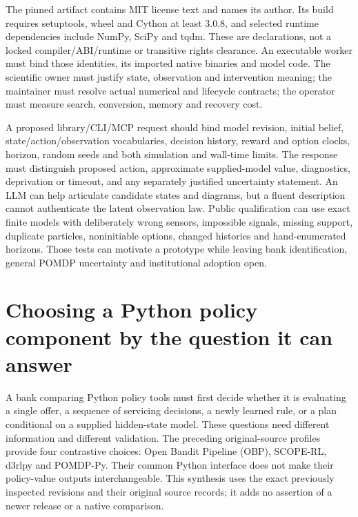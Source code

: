 The pinned artifact contains MIT license text and names its author. Its build
requires setuptools, wheel and Cython at least 3.0.8, and selected runtime
dependencies include NumPy, SciPy and tqdm. These are declarations, not a
locked compiler/ABI/runtime or transitive rights clearance. An executable worker
must bind those identities, its imported native binaries and model code. The
scientific owner must justify state, observation and intervention meaning; the
maintainer must resolve actual numerical and lifecycle contracts; the operator
must measure search, conversion, memory and recovery cost.
\cite{exec23_pomdppy_sources}

A proposed library/CLI/MCP request should bind model revision, initial belief,
state/action/observation vocabularies, decision history, reward and option clocks,
horizon, random seeds and both simulation and wall-time limits. The response
must distinguish proposed action, approximate supplied-model value, diagnostics,
deprivation or timeout, and any separately justified uncertainty statement.
An LLM can help articulate candidate states and diagrams, but a fluent
description cannot authenticate the latent observation law. Public qualification
can use exact finite models with deliberately wrong sensors, impossible signals,
missing support, duplicate particles, noninitiable options, changed histories
and hand-enumerated horizons. Those tests can motivate a prototype while leaving
bank identification, general POMDP uncertainty and institutional adoption open.


\section{Choosing a Python policy component by the question it can answer}
\label{sec:exec24-policies-python}

A bank comparing Python policy tools must first decide whether it is evaluating
a single offer, a sequence of servicing decisions, a newly learned rule, or a
plan conditional on a supplied hidden-state model. These questions need different
information and different validation. The preceding original-source profiles
provide four contrastive choices: Open Bandit Pipeline (OBP), SCOPE-RL, d3rlpy
and POMDP-Py. Their common Python interface does not make their policy-value
outputs interchangeable. This synthesis uses the exact previously inspected
revisions and their original source records; it adds no assertion of a newer
release or a native comparison.~\citep{exec23_obp_sources,exec23_scope_rl_sources,
exec15_d3rlpy_package,exec23_pomdppy_sources}

